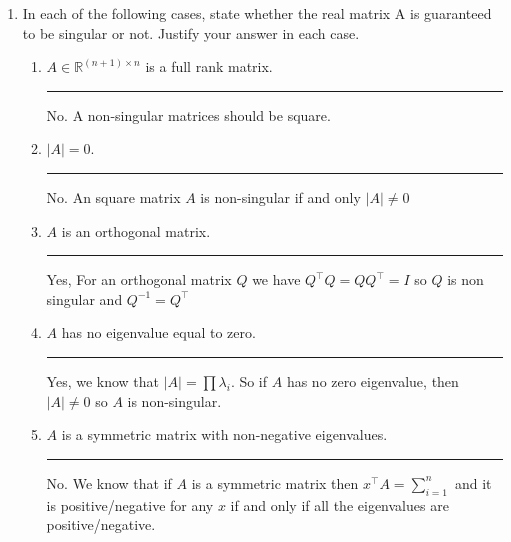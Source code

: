 \documentclass[12pt]{article}
\begin{document}
\begin{enumerate}
    \item In each of the following cases, state whether the real matrix A is guaranteed to be singular or not. Justify your answer in each case.
    
    \begin{enumerate}

        \item  $A \in \mathbb{R}^{(n+1) \times n}$ is a full rank matrix.
        
        \noindent\rule{\linewidth}{1pt}

        No. A non-singular matrices should be square.

        \item $|A| = 0$.
        
        \noindent\rule{\linewidth}{1pt}

        No. An square matrix $A$ is non-singular if and only $|A| \neq 0$

        \item $A$ is an orthogonal matrix.
        
        \noindent\rule{\linewidth}{1pt} 
        
        Yes, For an orthogonal matrix $Q$ we have $Q^\intercal Q = QQ^\intercal = I$ so $Q$ is non singular and $Q^{-1} = Q^\intercal$

        \item $A$ has no eigenvalue equal to zero.
        
        \noindent\rule{\linewidth}{1pt}

        Yes, we know that $|A| = \prod \lambda_i$. So if $A$ has no zero eigenvalue, then $|A| \neq 0$ so $A$ is non-singular.

        \item $A$ is a symmetric matrix with non-negative eigenvalues.
        
        \noindent\rule{\linewidth}{1pt}

        No. We know that if $A$ is a symmetric matrix then $x^\intercal A = \sum_{i=1}^{n}$ and it is positive/negative for any $x$ if and only if all the eigenvalues are positive/negative.

    \end{enumerate}
    
\end{enumerate}    
\end{document}
